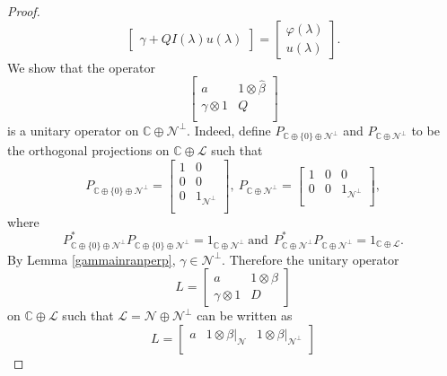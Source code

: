\documentclass[11pt, reqno]{amsart}
\newcommand\1{\boldsymbol {1}}
\numberwithin{equation}{section}
\begin{document}
\begin{proof}
$$\begin{bmatrix}
    \gamma +QI(\lambda)u(\lambda)
\end{bmatrix} =\begin{bmatrix}
    \varphi(\lambda) \\
    u(\lambda)
\end{bmatrix}.$$
We show that the operator 
$$\begin{bmatrix}
    a & 1\otimes{\hat{\beta}} \\
    \gamma\otimes 1 & Q \\
\end{bmatrix}$$
is a unitary operator on $\mathbb{C}\oplus\mathcal{N}^{\perp}$. Indeed, define $P_{\mathbb{C}\oplus\{0\}\oplus\mathcal{N}^{\perp}}$ and $P_{\mathbb{C}\oplus\mathcal{N}^{\perp}}$ to be the orthogonal projections on $\mathbb{C}\oplus\mathcal{L}$ such that
$$P_{\mathbb{C}\oplus\{0\}\oplus\mathcal{N}^{\perp}} = \begin{bmatrix}
    1       & 0 \\
   0       & 0 \\
   0 & 1_{\mathcal{N}^{\perp}}\\
\end{bmatrix},~P_{\mathbb{C}\oplus\mathcal{N}^{\perp}} = \begin{bmatrix}
    1       & 0 & 0\\
   0       & 0 & 1_{\mathcal{N}^{\perp}}\\
\end{bmatrix},$$
where 
\begin{equation}\label{projectionsforthistheorem}
P^{*}_{\mathbb{C}\oplus\{0\}\oplus\mathcal{N}^{\perp}}P_{\mathbb{C}\oplus\{0\}\oplus\mathcal{N}^{\perp}} = 1_{\mathbb{C}\oplus\mathcal{N}^{\perp}}~\text{and}~~P^{*}_{\mathbb{C}\oplus\mathcal{N}^{\perp}}P_{\mathbb{C}\oplus\mathcal{N}^{\perp}} = 1_{\mathbb{C}\oplus\mathcal{L}}.
\end{equation}
By Lemma \ref{gammainranperp}, $\gamma\in\mathcal{N}^{\perp}$. Therefore the unitary operator
\begin{equation}\label{Lmatrix}
L=\begin{bmatrix}
    a       & 1\otimes \beta \\
    \gamma \otimes 1       & D 
\end{bmatrix}
\end{equation}
on $\mathbb{C}\oplus\mathcal{L}$ such that $\mathcal{L}=\mathcal{N}\oplus\mathcal{N}^{\perp}$ can be written as 
$$L = \begin{bmatrix}
    a & 1\otimes \beta|_{\mathcal{N}} & 1\otimes \beta|_{\mathcal{N}^{\perp}}\\

\end{bmatrix}$$
\end{proof}
\end{document}
